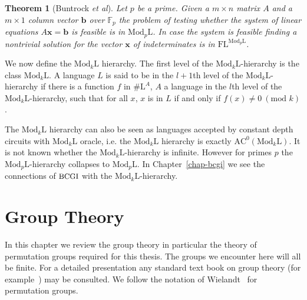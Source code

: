 \documentclass[11pt]{madras}%
\newtheorem{theorem}{Theorem}[chapter]
\theoremstyle{remark}
\newcommand{\ModkL}[1]{{\ensuremath{\mathrm{Mod}_{#1}\mathrm{L}}}}
\newcommand{\etal}[0]{{\emph{et al}}}
\newcommand{\ProblemFont}[1]{{\ensuremath{\textrm{\small #1}}}}
\begin{document}
\begin{theorem}[Buntrock \etal]%
  \label{thm-modp-linearalgb} 
  Let $p$ be a prime. Given a $m \times n$ matrix $A$ and a $m \times
  1$ column vector $\mathbf{b}$ over $\mathbb{F}_p$ the problem of
  testing whether the system of linear equations $A \mathbf{x} =
  \mathbf{b}$ is feasible is in $\ModkL{p}$. In case the system is
  feasible finding a nontrivial solution for the vector $\mathbf{x}$
  of indeterminates is in $\mathrm{FL}^{\ModkL{p}}$.
\end{theorem}

We now define the $\ModkL{k}$ hierarchy. The first level of the
$\ModkL{k}$-hierarchy is the class $\ModkL{k}$. A language $L$ is said
to be in the $l+1$th level of the $\ModkL{k}$-hierarchy if there is a
function $f$ in $\#\mathrm{L}^{A}$, $A$ a language in the $l$th level
of the $\ModkL{k}$-hierarchy, such that for all $x$, $x$ is in $L$ if
and only if $f(x) \neq 0\ (\textrm{mod } k)$.

The $\ModkL{k}$ hierarchy can also be seen as languages accepted by
constant depth circuits with $\ModkL{k}$ oracle, i.e. the $\ModkL{k}$
hierarchy is exactly $\mathrm{AC}^0(\ModkL{k})$. It is not known
whether the $\ModkL{k}$-hierarchy is infinite. However for primes $p$
the $\ModkL{p}$-hierarchy collapses to $\ModkL{p}$.  In
Chapter~\ref{chap-bcgi} we see the connections of $\ProblemFont{BCGI}$
with the $\ModkL{k}$-hierarchy.

\chapter{Group Theory}
\label{chap-group-theory}

In this chapter we review the group theory in particular the theory of
permutation groups required for this thesis.  The groups we encounter
here will all be finite.  For a detailed presentation any standard
text book on group theory (for example~\cite{hall}) may be consulted.
We follow the notation of Wielandt~\cite{wielandt64finite} for
permutation groups.
\end{document}
